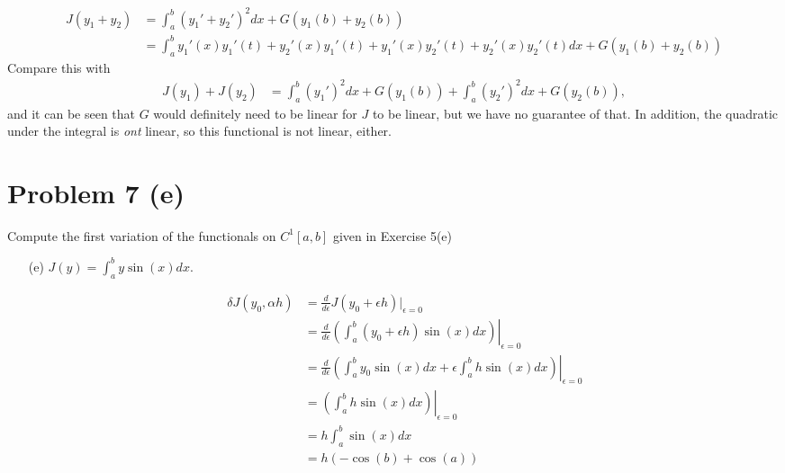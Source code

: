 \documentclass{article}
\begin{document}
\begin{enumerate}[label={(\alph*)}]
  \begin{equation*}
    \begin{split}
      J(y_1 + y_2) &= \int_a^b (y_1' + y_2')^2 dx + G(y_1(b) + y_2(b))\\
      & = \int_a^b y_1'(x)y_1'(t)  + y_2'(x)y_1'(t)
        + y_1'(x)y_2'(t) + y_2'(x)y_2'(t) dx + G(y_1(b) + y_2(b))
    \end{split}
  \end{equation*}
Compare this with 
\begin{equation*}
  \begin{split}
    J(y_1) + J(y_2) & = \int_a^b (y_1')^2 dx + G(y_1(b)) + \int_a^b (y_2')^2 dx + G(y_2(b)),
  \end{split}
\end{equation*}
and it can be seen that $G$ would definitely need to be linear for
$J$ to be linear, but we have no guarantee of that.  In addition, the
quadratic under the integral is \emph{ont} linear, so this functional
is not linear, either.
\end{enumerate}


\section*{Problem 7 (e)}
Compute the first variation of the functionals on $C^1[a,b]$ given in
Exercise 5(e)

\begin{enumerate}
\item[(e)] $ J(y) = \int_a^b y \sin(x) dx$.
\item[]\begin{equation*}
  \begin{split}
    \delta J(y_0, \alpha h) 
    &= \frac{d}{d\epsilon}J(y_0 + \epsilon h)|_{\epsilon
      =0}\\ 
    & = \frac{d}{d\epsilon}\left.\left(\int_a^b (y_0 + \epsilon h)
        \sin(x) dx\right)\right|_{\epsilon = 0}\\
    & =  \frac{d}{d\epsilon}\left.\left( 
      \int_a^b y_0 \sin(x) dx + 
      \epsilon \int_a^b  h \sin(x) dx\right)
      \right|_{\epsilon = 0}\\
    & =  \left.\left(\int_a^b  h \sin(x) dx \right)\right|_{\epsilon =
      0}\\
    & = h \int_a^b  \sin(x) dx\\
    & = h\left(-\cos(b) + \cos(a)\right)
  \end{split}
\end{equation*}

\end{enumerate}
\end{document}
